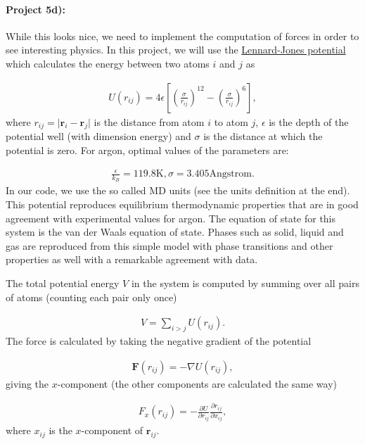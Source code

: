 \documentclass[%
oneside,                 %
final,                   %
10pt]{article}
\begin{document}
\paragraph{Project 5d):}
While this looks nice, we need to implement the computation of forces in order to see interesting physics. In this project, we will use the \href{{http://en.wikipedia.org/wiki/Lennard-Jones_potential}}{Lennard-Jones potential}  which calculates the energy between two atoms $i$ and $j$ as

\begin{align}
	U(r_{ij}) = 4\epsilon\left[\left(\frac{\sigma}{r_{ij}}\right)^{12} - \left(\frac{\sigma}{r_{ij}}\right)^6\right],
\end{align}
where $r_{ij} = \vert\mathbf{r}_i - \mathbf{r}_j\vert$ is the distance from atom $i$ to atom $j$, $\epsilon$ is the depth of the potential well (with dimension energy) and $\sigma$ is the distance at which the potential is zero. For argon, optimal values of the parameters are:

\begin{align}
	\frac{\epsilon}{k_B} = 119.8\mathrm{K}, \sigma=3.405 \mathrm{Angstrom}.
\end{align}
In our code, we use the so called MD units (see the units definition at the end). This potential reproduces equilibrium thermodynamic properties that are in good agreement with experimental values for argon. The equation of state for this system is the van der Waals equation of state. Phases such as solid, liquid and gas are reproduced from this simple model with phase transitions and other properties as well with a  remarkable agreement with data.

The total potential energy $V$ in the system is computed by summing over all pairs of atoms (counting each pair only once)

\begin{align}
	V = \sum_{i>j} U(r_{ij}).
\end{align}
The force is calculated by taking the negative gradient of the potential

\begin{align}
	\mathbf{F}(r_{ij}) = -\nabla U(r_{ij}),
\end{align}
giving the $x$-component (the other components are calculated the same way)

\begin{align}
	F_x(r_{ij}) = -\frac{\partial U}{\partial r_{ij}}\frac{\partial r_{ij}}{\partial x_{ij}},
\end{align}
where $x_{ij}$ is the $x$-component of $\mathbf{r}_{ij}$.
\end{document}
